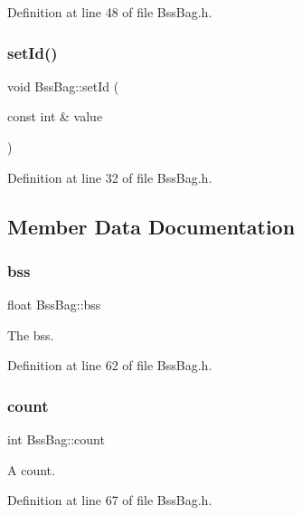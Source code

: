 Definition at line 48 of file Bss\+Bag.\+h.

\mbox{\label{class_bss_bag_a5dd08830be4efe94b32d53a66d87fb66}} 
\subsubsection{\texorpdfstring{set\+Id()}{setId()}}
{\footnotesize\ttfamily void Bss\+Bag\+::set\+Id (\begin{DoxyParamCaption}\item[{const int \&}]{value }\end{DoxyParamCaption})\hspace{0.3cm}{\ttfamily [inline]}}



Definition at line 32 of file Bss\+Bag.\+h.



\subsection{Member Data Documentation}
\mbox{\label{class_bss_bag_a8dee659da83dcfb77bebcb758d2e3522}} 
\subsubsection{\texorpdfstring{bss}{bss}}
{\footnotesize\ttfamily float Bss\+Bag\+::bss\hspace{0.3cm}{\ttfamily [protected]}}

The bss. 

Definition at line 62 of file Bss\+Bag.\+h.

\mbox{\label{class_bss_bag_adabd6cf3912f3bff5a31c2c897867556}} 
\subsubsection{\texorpdfstring{count}{count}}
{\footnotesize\ttfamily int Bss\+Bag\+::count\hspace{0.3cm}{\ttfamily [protected]}}

A count. 

Definition at line 67 of file Bss\+Bag.\+h.


